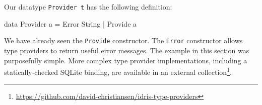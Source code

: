 Our datatype \texttt{Provider t} has the following definition:

\begin{code}
data Provider a = Error String
                | Provide a
\end{code}

\noindent
We have already seen the \texttt{Provide} constructor.
The \texttt{Error} constructor allows type providers to return useful error messages.
The example in this section was purposefully simple.
More complex type provider implementations, including a statically-checked SQLite binding, are available in an external collection\footnote{\url{https://github.com/david-christiansen/idris-type-providers}}.

